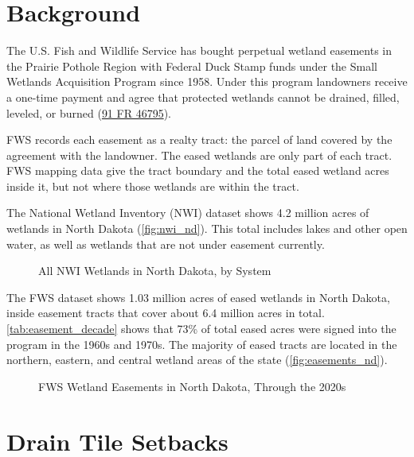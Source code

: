 \documentclass{theme/arpc-memo}
\begin{document}
\clearpage

\section{Background}

The U.S. Fish and Wildlife Service has bought perpetual wetland easements in the Prairie Pothole Region with Federal Duck Stamp funds under the Small Wetlands Acquisition Program since 1958. Under this program landowners receive a one-time payment and agree that protected wetlands cannot be drained, filled, leveled, or burned (\href{https://www.federalregister.gov/citation/91-FR-46795}{91 FR 46795}).

FWS records each easement as a realty tract: the parcel of land covered by the agreement with the landowner. The eased wetlands are only part of each tract. FWS mapping data give the tract boundary and the total eased wetland acres inside it, but not where those wetlands are within the tract. %

The National Wetland Inventory (NWI) dataset shows 4.2 million acres of wetlands in North Dakota (\autoref{fig:nwi_nd}). This total includes lakes and other open water, as well as wetlands that are not under easement currently.

\begin{figure}[htpb!]
\centering
\caption{All NWI Wetlands in North Dakota, by System}\label{fig:nwi_nd}
\end{figure}

The FWS dataset shows 1.03 million acres of eased wetlands in North Dakota, inside easement tracts that cover about 6.4 million acres in total. \autoref{tab:easement_decade} shows that 73\% of total eased acres were signed into the program in the 1960s and 1970s. The majority of eased tracts are located in the northern, eastern, and central wetland areas of the state (\autoref{fig:easements_nd}).



\begin{figure}[htpb!]
\centering
\caption{FWS Wetland Easements in North Dakota, Through the 2020s}\label{fig:easements_nd}
\end{figure}

\section{Drain Tile Setbacks}
\end{document}
